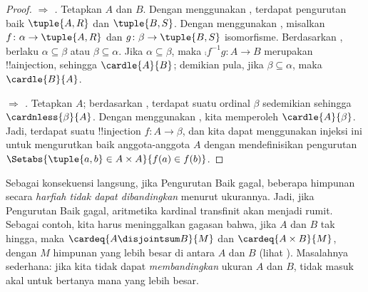\documentclass[../../../include/open-logic-section]{subfiles}
\begin{document}
\begin{proof}
\emph{ $\Rightarrow$ .} Tetapkan $A$ dan
$B$. Dengan menggunakan , terdapat pengurutan baik
$\tuple{A, R}$ dan $\tuple{B, S}$. Dengan menggunakan
, misalkan
$f \colon \alpha \to \tuple{A, R}$ dan
$g \colon \beta \to \tuple{B, S}$ isomorfisme. Berdasarkan
, berlaku
$\alpha \subseteq \beta$ atau $\beta \subseteq \alpha$. Jika
$\alpha \subseteq \beta$, maka
$\comp{f^{-1}}{g} \colon A \to B$ merupakan !!a{injection}, sehingga
$\cardle{A}{B}$; demikian pula, jika $\beta \subseteq \alpha$, maka
$\cardle{B}{A}$.

\emph{ $\Rightarrow$ .} Tetapkan $A$;
berdasarkan , terdapat suatu ordinal $\beta$ sedemikian
sehingga $\cardnless{\beta}{A}$. Dengan menggunakan ,
kita memperoleh $\cardle{A}{\beta}$. Jadi, terdapat suatu !!{injection}
$f \colon A \to \beta$, dan kita dapat menggunakan injeksi ini untuk
mengurutkan baik anggota-anggota $A$ dengan mendefinisikan pengurutan
$\Setabs{\tuple{a, b} \in A \times A}{f(a) \in f(b)}$.
\end{proof}
\noindent
Sebagai konsekuensi langsung, jika Pengurutan Baik gagal, beberapa himpunan
secara \emph{harfiah tidak dapat dibandingkan} menurut ukurannya. Jadi, jika
Pengurutan Baik gagal, aritmetika kardinal transfinit akan menjadi rumit.
Sebagai contoh, kita harus meninggalkan gagasan bahwa, jika $A$ dan $B$ tak
hingga, maka $\cardeq{A \disjointsum B}{M}$ dan
$\cardeq{A \times B}{M}$, dengan $M$ himpunan yang lebih besar di antara
$A$ dan $B$ (lihat
). Masalahnya sederhana: jika
kita tidak dapat \emph{membandingkan} ukuran $A$ dan $B$, tidak masuk akal
untuk bertanya mana yang lebih besar.
\end{document}

